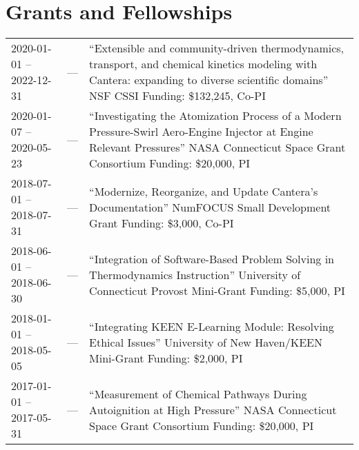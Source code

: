 \section{{\sectionfont Grants and Fellowships}}
\vspace{-0.32in}
\begin{center}
\begin{longtable}{lcl}
2020-01-01 -- 2022-12-31 & --- & \makecell{``Extensible and community-driven thermodynamics,\\
transport, and chemical kinetics modeling with\\Cantera: expanding to diverse scientific domains''\\ NSF CSSI \\ Funding: \$132,245, Co-PI} \\
2020-01-07 -- 2020-05-23 & --- & \makecell{``Investigating the Atomization Process of a Modern\\
Pressure-Swirl Aero-Engine Injector at Engine\\Relevant Pressures''\\NASA Connecticut Space Grant Consortium \\ Funding: \$20,000, PI} \\
2018-07-01 -- 2018-07-31 & --- & \makecell{``Modernize, Reorganize, and Update Cantera's \\
Documentation'' \\ NumFOCUS Small Development Grant \\ Funding: \$3,000, Co-PI} \\
2018-06-01 -- 2018-06-30 & --- & \makecell{``Integration of Software-Based Problem Solving in \\
Thermodynamics Instruction'' \\ University of Connecticut Provost Mini-Grant \\ Funding: \$5,000, PI} \\
2018-01-01 -- 2018-05-05 & --- & \makecell{``Integrating KEEN E-Learning Module: Resolving\\
Ethical Issues'' \\ University of New Haven/KEEN Mini-Grant \\ Funding: \$2,000, PI} \\
2017-01-01 -- 2017-05-31 & --- & \makecell{``Measurement of Chemical Pathways During\\Autoignition at High Pressure'' \\ NASA Connecticut Space Grant Consortium \\ Funding: \$20,000, PI} \\

\end{longtable}
\end{center}

